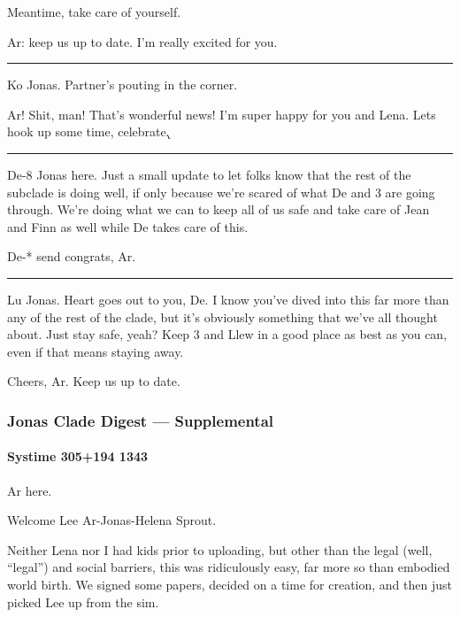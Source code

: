Meantime, take care of yourself.

Ar: keep us up to date. I'm really excited for you.

\begin{center}\rule{0.5\linewidth}{\linethickness}\end{center}

Ko Jonas. Partner's pouting in the corner.

Ar! Shit, man! That's wonderful news! I'm super happy for you and Lena. Lets hook up some time, celebrate.̨

\begin{center}\rule{0.5\linewidth}{\linethickness}\end{center}

De-8 Jonas here. Just a small update to let folks know that the rest of the subclade is doing well, if only because we're scared of what De and 3 are going through. We're doing what we can to keep all of us safe and take care of Jean and Finn as well while De takes care of this.

De-* send congrats, Ar.

\begin{center}\rule{0.5\linewidth}{\linethickness}\end{center}

Lu Jonas. Heart goes out to you, De. I know you've dived into this far more than any of the rest of the clade, but it's obviously something that we've all thought about. Just stay safe, yeah? Keep 3 and Llew in a good place as best as you can, even if that means staying away.

Cheers, Ar. Keep us up to date.

\hypertarget{jonas-clade-digest-supplemental-1}{%
\subsubsection{Jonas Clade Digest --- Supplemental}\label{jonas-clade-digest-supplemental-1}}

\hypertarget{systime-305194-1343}{%
\paragraph{Systime 305+194 1343}\label{systime-305194-1343}}

Ar here.

Welcome Lee Ar-Jonas-Helena Sprout.

Neither Lena nor I had kids prior to uploading, but other than the legal (well, ``legal'') and social barriers, this was ridiculously easy, far more so than embodied world birth. We signed some papers, decided on a time for creation, and then just picked Lee up from the sim.

